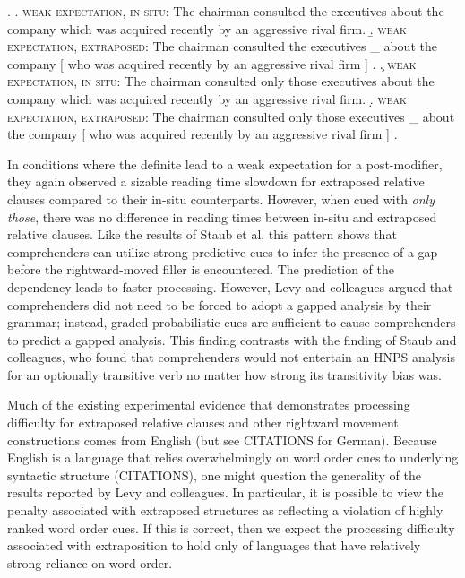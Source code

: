 \documentclass[12pt]{article}
\begin{document}
					\ex.	\label{levyonlythose}
					\a.	\textsc{weak expectation, in situ}: The chairman consulted the executives about the company which was acquired recently by an aggressive rival firm.
					\b.	\textsc{weak expectation, extraposed}: The chairman consulted the executives \_ about the company [ who was acquired recently by an aggressive rival firm ] .
					\c.	\textsc{weak expectation, in situ}: The chairman consulted only those executives about the company which was acquired recently by an aggressive rival firm.
					\d.	\textsc{weak expectation, extraposed}: The chairman consulted only those executives \_ about the company [ who was acquired recently by an aggressive rival firm ] .

	In conditions where the definite lead to a weak expectation for a post-modifier, they again observed a sizable reading time slowdown for extraposed relative clauses compared to their in-situ counterparts. However, when cued with \textit{only those}, there was no difference in reading times between in-situ and extraposed relative clauses. Like the results of Staub et al, this pattern shows that comprehenders can utilize strong predictive cues to infer the presence of a gap before the rightward-moved filler is encountered. The prediction of the dependency leads to faster processing. However, Levy and colleagues argued that comprehenders did not need to be forced to adopt a gapped analysis by their grammar; instead, graded probabilistic cues are sufficient to cause comprehenders to predict a gapped analysis. This finding contrasts with the finding of Staub and colleagues, who found that comprehenders would not entertain an HNPS analysis for an optionally transitive verb no matter how strong its transitivity bias was.	
	
	 Much of the existing experimental evidence that demonstrates processing difficulty for extraposed relative clauses and other rightward movement constructions comes from English (but see CITATIONS for German). Because English is a language that relies overwhelmingly on word order cues to underlying syntactic structure (CITATIONS), one might question the generality of the results reported by Levy and colleagues. In particular, it is possible to view the penalty associated with extraposed structures as reflecting a violation of highly ranked word order cues. If this is correct, then we expect the processing difficulty associated with extraposition to hold only of languages that have relatively strong reliance on word order. 	 
	 
\end{document}
